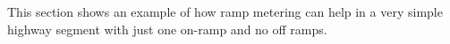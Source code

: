 
This section shows an example of how ramp metering can help in a very simple highway segment with just one on-ramp and no off ramps. 

